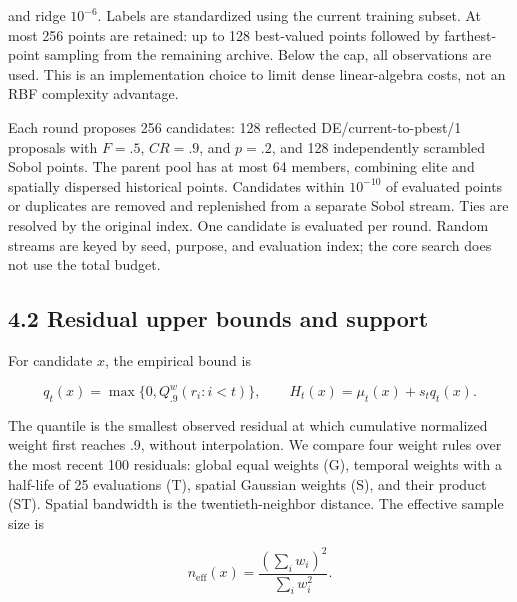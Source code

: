 \documentclass[11pt,a4paper]{article}
\begin{document}
and ridge \(10^{-6}\). Labels are standardized using the current
training subset. At most 256 points are retained: up to 128 best-valued
points followed by farthest-point sampling from the remaining archive.
Below the cap, all observations are used. This is an implementation
choice to limit dense linear-algebra costs, not an RBF complexity
advantage.

Each round proposes 256 candidates: 128 reflected DE/current-to-pbest/1
proposals with \(F=.5\), \(CR=.9\), and \(p=.2\), and 128 independently
scrambled Sobol points. The parent pool has at most 64 members,
combining elite and spatially dispersed historical points. Candidates
within \(10^{-10}\) of evaluated points or duplicates are removed and
replenished from a separate Sobol stream. Ties are resolved by the
original index. One candidate is evaluated per round. Random streams are
keyed by seed, purpose, and evaluation index; the core search does not
use the total budget.

\par{}\noindent\begin{minipage}{\linewidth}

\hypertarget{residual-upper-bounds-and-support}{%
\subsection{4.2 Residual upper bounds and
support}\label{residual-upper-bounds-and-support}}

For candidate \(x\), the empirical bound is

\[q_t(x)=\max\{0,Q^w_{.9}(r_i:i<t)\},\qquad H_t(x)=\mu_t(x)+s_tq_t(x).\]

\end{minipage}\par

\par\noindent\begin{minipage}{\linewidth}

The quantile is the smallest observed residual at which cumulative
normalized weight first reaches .9, without interpolation. We compare
four weight rules over the most recent 100 residuals: global equal
weights (G), temporal weights with a half-life of 25 evaluations (T),
spatial Gaussian weights (S), and their product (ST). Spatial bandwidth
is the twentieth-neighbor distance. The effective sample size is

\[n_{\mathrm{eff}}(x)=\frac{(\sum_iw_i)^2}{\sum_iw_i^2}.\]

\end{minipage}\par
\end{document}
